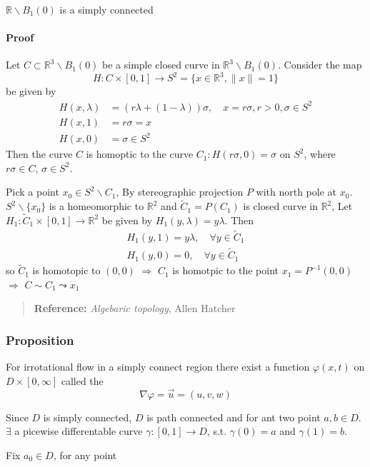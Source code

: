 
$\mathbb{R}\backslash B_1(0)$ is a simply connected

\paragraph{Proof} %

Let $C\subset \mathbb{R}^3\backslash B_1(0)$ be a simple closed curve in $\mathbb{R}^3\backslash B_1(0)$. Consider the map
\begin{equation}
H : C\times [0,1]\to S^2 = \{x\in\mathbb{R}^3,\lVert x\rVert = 1\}
\end{equation}
be given by
\begin{equation}
\begin{aligned}
H(x,\lambda) &= \left(r\lambda + (1-\lambda)\right)\sigma,\quad x=r\sigma, r>0, \sigma \in S^2\\
H(x,1) &= r\sigma = x\\
H(x,0) &= \sigma \in S^2
\end{aligned}
\end{equation}
Then the curve $C$ is homoptic to the curve $C_1 : H(r\sigma,0)=\sigma$ on $S^2$, where $r\sigma \in C$, $\sigma \in S^2$.

Pick a point $x_0\in S^2\backslash C_1$, By stereographic projection $P$ with north pole at $x_0$. $S^2\backslash \{x_0\}$ is a homeomorphic to $\mathbb{R}^2$ and $\widetilde{C}_1 = P(C_1)$ is closed curve in $\mathbb{R}^2$, Let $H_1 : \widetilde{C}_1 \times [0,1] \to \mathbb{R}^2$ be given by $H_1(y,\lambda) = y\lambda$. Then
\begin{equation}
\begin{aligned}
H_1 (y,1) = y\lambda ,\quad \forall y \in \widetilde{C}_1\\
H_1 (y,0) = 0,\quad \forall y \in \widetilde{C}_1
\end{aligned}
\end{equation}
so $\widetilde{C}_1$ is homotopic to $(0,0)$ $\Rightarrow$ $C_1$ is homotpic to the point $x_1 = P^{-1}(0,0)$ $\Rightarrow$ $C\sim C_1 \leadsto x_1$

\begin{quote}
	\textbf{Reference:} \textit{Algebaric topology}, Allen Hatcher
\end{quote}

\subsubsection{Proposition} %

For irrotational flow in a simply connect region there exist a function $\varphi(x,t)$ on $D\times [0,\infty]$ called the 
\begin{equation}
\nabla \varphi = \vec{u} = (u,v,w)
\end{equation}



Since $D$ is simply connected, $D$ is path connected and for ant two point $a,b\in D$. $\exists$ a picewise differentable curve $\gamma : [0,1] \to D$, s.t. $\gamma(0) = a$ and $\gamma(1) = b$.

Fix $a_{0} \in D$, for any point

